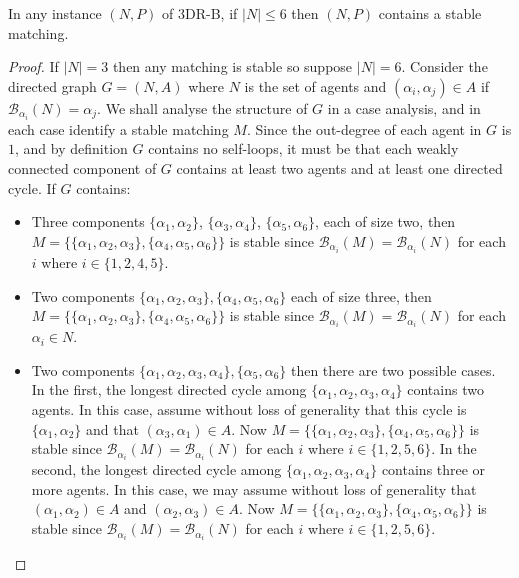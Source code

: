 \begin{thm}
\label{thm:threed_sr_b_ifnis6thensmexists}
In any instance $(N, P)$ of 3DR-B, if $|N| \leq 6$ then $(N, P)$ contains a stable matching.
\end{thm}
\begin{proof}
If $|N| = 3$ then any matching is stable so suppose $|N| = 6$. Consider the directed graph $G = (N, A)$ where $N$ is the set of agents and $( \alpha_i, \alpha_j ) \in A$ if $\mathscr{B}_{\alpha_i}(N) = \alpha_j$. We shall analyse the structure of $G$ in a case analysis, and in each case identify a stable matching $M$. Since the out-degree of each agent in $G$ is $1$, and by definition $G$ contains no self-loops, it must be that each weakly connected component of $G$ contains at least two agents and at least one directed cycle. If $G$ contains:
\begin{itemize}
    \item Three components $\{ \alpha_1, \alpha_2 \}$, $\{ \alpha_3, \alpha_4 \}$, $\{ \alpha_5, \alpha_6 \}$, each of size two, then $M = \{ \{ \alpha_1, \alpha_2, \alpha_3 \}, \{ \alpha_4, \alpha_5, \alpha_6 \} \}$ is stable since $\mathscr{B}_{\alpha_i}(M) = \mathscr{B}_{\alpha_i}(N)$ for each $i$ where $i \in \{ 1, 2, 4, 5 \}$.
    
    \item Two components $\{ \alpha_1, \alpha_2, \alpha_3 \}, \{ \alpha_4, \alpha_5, \alpha_6 \}$ each of size three, then $M = \{ \{ \alpha_1, \alpha_2, \alpha_3 \}, \{ \alpha_4, \alpha_5, \alpha_6 \} \}$ is stable since $\mathscr{B}_{\alpha_i}(M) = \mathscr{B}_{\alpha_i}(N)$ for each $\alpha_i \in N$.
    
    \item Two components $\{ \alpha_1, \alpha_2, \alpha_3, \alpha_4 \},\{ \alpha_5, \alpha_6 \}$ then there are two possible cases. In the first, the longest directed cycle among $\{ \alpha_1, \alpha_2, \alpha_3, \alpha_4 \}$ contains two agents. In this case, assume without loss of generality that this cycle is $\{ \alpha_1, \alpha_2 \}$ and that $( \alpha_3, \alpha_1 ) \in A$. Now $M = \{ \{ \alpha_1, \alpha_2, \alpha_3 \}, \{ \alpha_4, \alpha_5, \alpha_6 \} \}$ is stable since $\mathscr{B}_{\alpha_i}(M) = \mathscr{B}_{\alpha_i}(N)$ for each $i$ where $i \in \{ 1, 2, 5, 6 \}$. In the second, the longest directed cycle among $\{ \alpha_1, \alpha_2, \alpha_3, \alpha_4 \}$ contains three or more agents. In this case, we may assume without loss of generality that $( \alpha_1, \alpha_2 ) \in A$ and $( \alpha_2, \alpha_3 ) \in A$. Now $M = \{ \{ \alpha_1, \alpha_2, \alpha_3 \}, \{ \alpha_4, \alpha_5, \alpha_6 \} \}$ is stable since $\mathscr{B}_{\alpha_i}(M) = \mathscr{B}_{\alpha_i}(N)$ for each $i$ where $i \in \{ 1, 2, 5, 6 \}$.
    

\end{itemize}
\end{proof}
